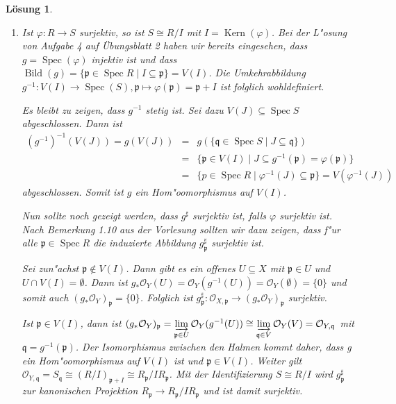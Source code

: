 \documentclass[paper = A4, fontsize=12pt, numbers=noendperiod, chapterprefix=true]{scrbook}
\theoremstyle{break}
\newtheorem{Loes}{L\"osung}
\theoremstyle{nonumberbreak}
\theoremstyle{nonumberplain}
\DeclareMathOperator{\Spec}{Spec}
\DeclareMathOperator{\Kern}{Kern}
\DeclareMathOperator{\Bild}{Bild}
\newcommand{\p}{\mathfrak{p}} %
\newcommand{\q}{\mathfrak{q}} %
\begin{document}
\begin{Loes}
\begin{enumerate}%
  \item[c)] Ist $\varphi\colon R \to S$ surjektiv, so ist $S \cong R/I$ mit $I = \Kern(\varphi)$. Bei der L"osung von Aufgabe 4 auf \"Ubungsblatt 2 haben wir bereits eingesehen, dass $g = \Spec(\varphi)$ injektiv ist und dass $\Bild(g) = \{ \p \in \Spec R \mid I \subseteq \p \} = V(I)$. Die Umkehrabbildung $g^{-1} \colon V(I) \to \Spec(S), \p \mapsto \varphi(\p) = \p + I$ ist folglich wohldefiniert.
  
  Es bleibt zu zeigen, dass $g^{-1}$ stetig ist. Sei dazu $V(J) \subseteq \Spec S$ abgeschlossen. Dann ist 
  $$ \begin{array}{rcl}
        (g^{-1})^{-1}(V(J))
  = g(V(J))
  &=& g(\{\q \in \Spec S \mid J \subseteq \q \})\\
  &=& \{ \p \in V(I) \mid J \subseteq g^{-1}(\p) = \varphi(\p)\}\\
  &=& \{p \in \Spec R \mid \varphi^{-1}(J) \subseteq \p \} = V(\varphi^{-1}(J))
     \end{array}
  $$
  abgeschlossen.
  Somit ist $g$ ein Hom"oomorphismus auf $V(I)$.
  
  Nun sollte noch gezeigt werden, dass $g^\sharp$ surjektiv ist, falls $\varphi$ surjektiv ist. Nach Bemerkung 1.10 aus der Vorlesung sollten wir dazu zeigen, dass f"ur alle $\p \in \Spec R$ die induzierte Abbildung $g^\sharp_{\p}$ surjektiv ist.
  
  Sei zun"achst $\p \notin V(I)$. Dann gibt es ein offenes $U \subseteq X$ mit $\p \in U$ und $U \cap V(I)= \emptyset$. Dann ist $g_\ast \mathcal{O}_Y(U) = \mathcal{O}_Y(g^{-1}(U)) = \mathcal{O}_Y(\emptyset) = \{0\}$ und somit auch $(g_\ast \mathcal{O}_Y)_{\p} = \{0\}$. Folglich ist $g_{\p}^\sharp\colon \mathcal{O}_{X,\p} \to (g_\ast\mathcal{O}_Y)_{\p}$ surjektiv. 
  
  Ist $\p \in V(I)$, dann ist $(g_\ast \mathcal{O}_Y)_{\p} = \varinjlim\limits_{\p \in U} \mathcal{O}_Y(g^{-1}(U)) \cong \varinjlim\limits_{\q \in V} \mathcal{O}_Y(V) = \mathcal{O}_{Y,\q}$ mit $\q = g^{-1}(\p)$. Der Isomorphismus zwischen den Halmen kommt daher, dass g ein Hom"oomorphismus auf $V(I)$ ist und $\p \in V(I)$.
  Weiter gilt $\mathcal{O}_{Y,\q} = S_{\q} \cong (R/I)_{\p+I} \cong R_{\p}/I  R_{\p}$. Mit der Identifizierung $S \cong R/I$ wird $g^\sharp_{\p}$ zur kanonischen Projektion $R_{\p} \to R_{\p}/I R_{\p}$ und ist damit surjektiv.
\end{enumerate}
\end{Loes}
\end{document}
